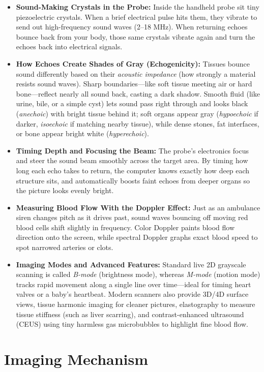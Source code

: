 \begin{itemize}
    \item \textbf{Sound-Making Crystals in the Probe:} Inside the handheld probe sit tiny piezoelectric crystals. When a brief electrical pulse hits them, they vibrate to send out high-frequency sound waves (2--18 MHz). When returning echoes bounce back from your body, those same crystals vibrate again and turn the echoes back into electrical signals.
    \item \textbf{How Echoes Create Shades of Gray (Echogenicity):} Tissues bounce sound differently based on their \textit{acoustic impedance} (how strongly a material resists sound waves). Sharp boundaries---like soft tissue meeting air or hard bone---reflect nearly all sound back, casting a dark shadow. Smooth fluid (like urine, bile, or a simple cyst) lets sound pass right through and looks black (\textit{anechoic}) with bright tissue behind it; soft organs appear gray (\textit{hypoechoic} if darker, \textit{isoechoic} if matching nearby tissue), while dense stones, fat interfaces, or bone appear bright white (\textit{hyperechoic}).
    \item \textbf{Timing Depth and Focusing the Beam:} The probe's electronics focus and steer the sound beam smoothly across the target area. By timing how long each echo takes to return, the computer knows exactly how deep each structure sits, and automatically boosts faint echoes from deeper organs so the picture looks evenly bright.
    \item \textbf{Measuring Blood Flow With the Doppler Effect:} Just as an ambulance siren changes pitch as it drives past, sound waves bouncing off moving red blood cells shift slightly in frequency. Color Doppler paints blood flow direction onto the screen, while spectral Doppler graphs exact blood speed to spot narrowed arteries or clots.
    \item \textbf{Imaging Modes and Advanced Features:} Standard live 2D grayscale scanning is called \textit{B-mode} (brightness mode), whereas \textit{M-mode} (motion mode) tracks rapid movement along a single line over time---ideal for timing heart valves or a baby's heartbeat. Modern scanners also provide 3D/4D surface views, tissue harmonic imaging for cleaner pictures, elastography to measure tissue stiffness (such as liver scarring), and contrast-enhanced ultrasound (CEUS) using tiny harmless gas microbubbles to highlight fine blood flow.
\end{itemize}

\section{Imaging Mechanism}

